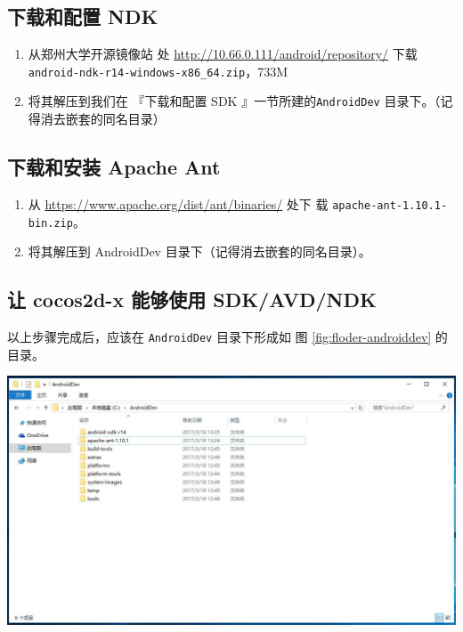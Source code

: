 \documentclass[a4paper, 10pt]{article}
\begin{document}
\subsection{下载和配置 NDK}

\begin{enumerate}
\item 从郑州大学开源镜像站
  处 \url{http://10.66.0.111/android/repository/} 下载\\
  \texttt{android-ndk-r14-windows-x86\_64.zip}，733M
  
\item 将其解压到我们在 『下载和配置 SDK 』一节所建的\texttt{AndroidDev}
  目录下。（记得消去嵌套的同名目录）
\end{enumerate}

\subsection{下载和安装 Apache Ant}

\begin{enumerate}
\item 从 \url{https://www.apache.org/dist/ant/binaries/} 处下
  载 \texttt{apache-ant-1.10.1-bin.zip}。
  
\item 将其解压到 AndroidDev 目录下（记得消去嵌套的同名目录）。
\end{enumerate}

\subsection{让 cocos2d-x 能够使用 SDK/AVD/NDK}

以上步骤完成后，应该在 \texttt{AndroidDev} 目录下形成如
图 \ref{fig:floder-androiddev} 的目录。


\begin{center}
  \includegraphics*[width=\textwidth]{images/androiddev-folder}
\end{center}
\end{document}
